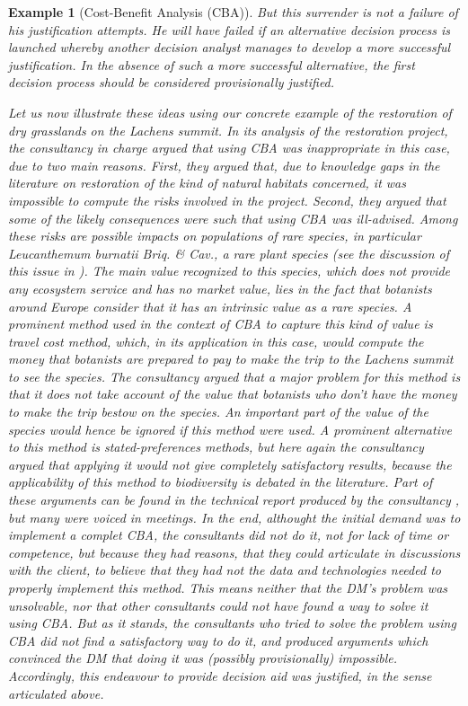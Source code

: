 \documentclass[preprint, french, english, 11pt, authoryear]{elsarticle}%
\newtheorem{example}{Example}
\begin{document}
\begin{example}[Cost-Benefit Analysis (CBA)]
But this surrender is not a failure of his justification attempts. He will have failed if an alternative decision process is launched whereby another decision analyst manages to develop a more successful justification. In the absence of such a more successful alternative, the first decision process should be considered provisionally justified.

Let us now illustrate these ideas using our concrete example of the restoration of dry grasslands on the Lachens summit. In its analysis of the restoration project, the consultancy in charge argued that using CBA was inappropriate in this case, due to two main reasons. First, they argued that, due to knowledge gaps in the literature on restoration of the kind of natural habitats concerned, it was impossible to compute the risks involved in the project. Second, they argued that some of the likely consequences were such that using CBA was ill-advised. Among these risks are possible impacts on populations of rare species, in particular \emph{Leucanthemum burnatii} Briq. \& Cav., a rare plant species (see the discussion of this issue in \cite{meinard_ethical_2016}). The main value recognized to this species, which does not provide any ecosystem service and has no market value, lies in the fact that botanists around Europe consider that it has an intrinsic value as a rare species. A prominent method used in the context of CBA to capture this kind of value is travel cost method, which, in its application in this case, would compute the money that botanists are prepared to pay to make the trip to the Lachens summit to see the species. The consultancy argued that a major problem for this method is that it does not take account of the value that botanists who don't have the money to make the trip bestow on the species. An important part of the value of the species would hence be ignored if this method were used. A prominent alternative to this method is stated-preferences methods, but here again the consultancy argued that applying it would not give completely satisfactory results, because the applicability of this method to biodiversity is debated in the literature. Part of these arguments can be found in the technical report produced by the consultancy \citep{meinard_etude_2015}, but many were voiced in meetings. In the end, althought the initial demand was to implement a complet CBA, the consultants did not do it, not for lack of time or competence, but because they had reasons, that they could articulate in discussions with the client, to believe that they had not the data and technologies needed to properly implement this method. This means neither that the \ac{DM}'s problem was unsolvable, nor that other consultants could not have found a way to solve it using CBA. But as it stands, the consultants who tried to solve the problem using CBA did not find a satisfactory way to do it, and produced arguments which convinced the \ac{DM} that doing it was (possibly provisionally) impossible. Accordingly, this endeavour to provide decision aid was justified, in the sense articulated above.
\end{example}
\end{document}
